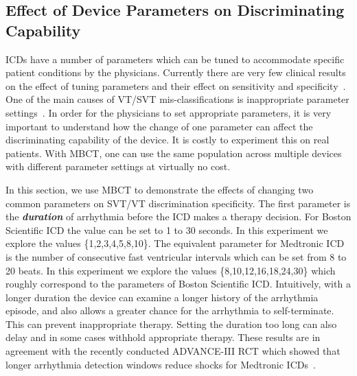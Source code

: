  \subsection{Effect of Device Parameters on Discriminating Capability}
ICDs have a number of parameters which can be tuned to accommodate specific patient conditions by the physicians. 
Currently there are very few clinical results on the effect of tuning parameters and their effect on sensitivity and specificity~\cite{maditrit}.
One of the main causes of VT/SVT mis-classifications is inappropriate parameter settings~\cite{wrong_sensing}.
In order for the physicians to set appropriate parameters, it is very important to understand how the change of one parameter can affect the discriminating capability of the device.
It is costly to experiment this on real patients.
With MBCT, one can use the same population across multiple devices with different parameter settings at virtually no cost. 

In this section, we use MBCT to demonstrate the effects of changing two common parameters on SVT/VT discrimination specificity.
The first parameter is the \emph{\textbf{duration}} of arrhythmia before the ICD makes a therapy decision. 
For Boston Scientific ICD the value can be set to 1 to 30 seconds.
In this experiment we explore the values \{1,2,3,4,5,8,10\}.
The equivalent parameter for Medtronic ICD is the number of consecutive fast ventricular intervals which can be set from 8 to 20 beats.
In this experiment we explore the values \{8,10,12,16,18,24,30\} which roughly correspond to the parameters of Boston Scientific ICD.
Intuitively, with a longer duration the device can examine a longer history of the arrhythmia episode, and also allows a greater chance for the arrhythmia to self-terminate. 
This can prevent inappropriate therapy.
Setting the duration too long can also delay and in some cases withhold appropriate therapy. 
These results are in agreement with the recently conducted ADVANCE-III RCT which showed that longer arrhythmia detection windows reduce shocks for Medtronic ICDs~\cite{advance3}.

